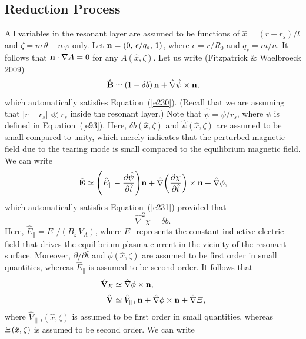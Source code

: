 \documentclass[notitlepage,12pt]{article}
\begin{document}
\subsection{Reduction Process} 
All variables in the resonant layer are assumed to be functions of $\hat{x}=(r-r_s)/l$ and $\zeta=m\,\theta-n\,\varphi$ only. 
Let ${\bf n} = (0,\,\epsilon/q_s,\,1)$, where $\epsilon=r/R_0$ and $q_s=m/n$. It follows that ${\bf n}\cdot\nabla A=0$ for any $A(\hat{x},\zeta)$. 
Let us write (Fitzpatrick \& Waelbroeck 2009)
\begin{equation}\label{e238}
\hat{\bf B} \simeq (1+ \delta b)\,{\bf n} + \hat{\nabla}\hat{\psi}\times {\bf n},
\end{equation}
which automatically satisfies Equation~(\ref{e230}). (Recall that we are assuming that $|r-r_s|\ll r_s$ inside the resonant layer.) Note that $\hat{\psi}=\psi/r_s$, where $\psi$ is defined in Equation~(\ref{e93}).
 Here, $\delta b(\hat{x},\zeta)$ and $\hat{\psi}(\hat{x},\zeta)$ are assumed to be small
compared to unity, which merely indicates that the perturbed magnetic field due to the tearing mode is small compared to the
equilibrium magnetic field.  We can write
\begin{equation}
\hat{\bf E} \simeq \left(\hat{E}_\parallel- \frac{\partial \hat{\psi}}{\partial \hat{t}}\right)\!{\bf n} + \hat{\nabla}\!\left(\frac{\partial\chi}{\partial \hat{t}}\right)\times {\bf n} + \hat{\nabla}\phi,
\end{equation}
which automatically satisfies Equation~(\ref{e231}) provided that
\begin{equation}
\hat{\nabla}^2\chi =\delta b.
\end{equation}
Here, $\hat{E}_\parallel = E_\parallel/(B_z\,V_A)$, where $E_\parallel$ represents the constant inductive electric field that drives the equilibrium plasma current in the vicinity of the resonant surface. Moreover, $\partial/\partial \hat{t}$ and $\phi(\hat{x},\zeta)$
are 
assumed to be first order in small quantities, whereas $\hat{E}_\parallel$ is assumed to be second order. 
It follows that
\begin{align}
\hat{\bf V}_E &\simeq \hat{\nabla}\phi\times {\bf n},\\[0.5ex]
\hat{\bf V} &\simeq \hat{V}_{\parallel\,i}\,{\bf n}+  \hat{\nabla}\phi\times {\bf n}+\hat{\nabla}{\mit\Xi},
\end{align}
where $\hat{V}_{\parallel\,i}(\hat{x},\zeta)$ is assumed to be first order in small quantities, whereas ${\mit\Xi}(\hat{x},\zeta)$ is assumed to be
second order. 
We can write
\end{document}
